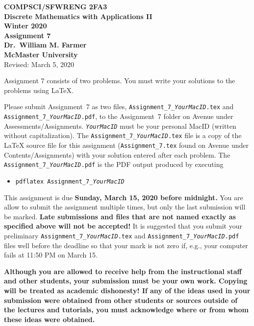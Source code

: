 \documentclass[11pt,fleqn]{article}
\begin{document}
\begin{center}

  {\large \textbf{COMPSCI/SFWRENG 2FA3}}\\[2mm]
  {\large \textbf{Discrete Mathematics with Applications II}}\\[2mm]
  {\large \textbf{Winter 2020}}\\[8mm]
  {\huge \textbf{Assignment 7}}\\[6mm]
  {\large \textbf{Dr.~William M. Farmer}}\\[2mm]
  {\large \textbf{McMaster University}}\\[6mm]
  {\large Revised: March 5, 2020}

\end{center}

\medskip

Assignment 7 consists of two problems.  You must write your solutions
to the problems using LaTeX.

Please submit Assignment~7 as two files,
\texttt{Assignment\_7\_\emph{YourMacID}.tex} and
\texttt{Assignment\_7\_\emph{YourMacID}.pdf}, to the Assignment~7
folder on Avenue under Assessments/Assignments.
\texttt{\emph{YourMacID}} must be your personal MacID (written without
capitalization).  The \texttt{Assignment\_7\_\emph{YourMacID}.tex}
file is a copy of the LaTeX source file for this assignment
(\texttt{Assignment\_7.tex} found on Avenue under
Contents/Assignments) with your solution entered after each problem.
The \texttt{Assignment\_7\_\emph{YourMacID}.pdf} is the PDF output
produced by executing

\begin{itemize}

  \item[] \texttt{pdflatex Assignment\_7\_\emph{YourMacID}}

\end{itemize}

This assignment is due \textbf{Sunday, March 15, 2020 before
  midnight.}  You are allow to submit the assignment multiple times,
but only the last submission will be marked.  \textbf{Late submissions
  and files that are not named exactly as specified above will not be
  accepted!}  It is suggested that you submit your preliminary
\texttt{Assignment\_7\_\emph{YourMacID}.tex} and
\texttt{Assignment\_7\_\emph{YourMacID}.pdf} files well before the
deadline so that your mark is not zero if, e.g., your computer fails
at 11:50 PM on March 15.

\textbf{Although you are allowed to receive help from the
  instructional staff and other students, your submission must be your
  own work.  Copying will be treated as academic dishonesty! If any of
  the ideas used in your submission were obtained from other students
  or sources outside of the lectures and tutorials, you must
  acknowledge where or from whom these ideas were obtained.}
\end{document}
